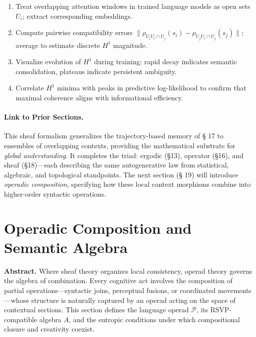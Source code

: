 \documentclass[12pt,a4paper,twoside,openright]{book}
\begin{document}
\begin{enumerate}
\item Treat overlapping attention windows in trained language models as open sets \(U_i\); extract corresponding embeddings.
\item Compute pairwise compatibility errors \(\| \rho_{U_iU_i\cap U_j}(s_i) - \rho_{U_jU_i\cap U_j}(s_j)\|\); average to estimate discrete \(H^1\) magnitude.
\item Visualize evolution of \(H^1\) during training: rapid decay indicates semantic consolidation, plateaus indicate persistent ambiguity.
\item Correlate \(H^1\) minima with peaks in predictive log-likelihood to confirm that maximal coherence aligns with informational efficiency.
\end{enumerate}

\paragraph{Link to Prior Sections.}
This sheaf formalism generalizes the trajectory-based memory of § 17 to ensembles of overlapping contexts, providing the mathematical substrate for \emph{global understanding}.  
It completes the triad: ergodic (\S 13), operator (\S 16), and sheaf (\S 18)---each describing the same autogenerative law from statistical, algebraic, and topological standpoints.  
The next section (§ 19) will introduce \emph{operadic composition}, specifying how these local context morphisms combine into higher-order syntactic operations.


\section{Operadic Composition and Semantic Algebra}
\label{sec:operad}

\textbf{Abstract.}
Where sheaf theory organizes local consistency, operad theory governs the algebra of combination.  
Every cognitive act involves the composition of partial operations—syntactic joins, perceptual fusions, or coordinated movements—whose structure is naturally captured by an operad acting on the space of contextual sections.  
This section defines the language operad $\mathcal{P}$, its RSVP-compatible algebra $A$, and the entropic conditions under which compositional closure and creativity coexist.
\end{document}
